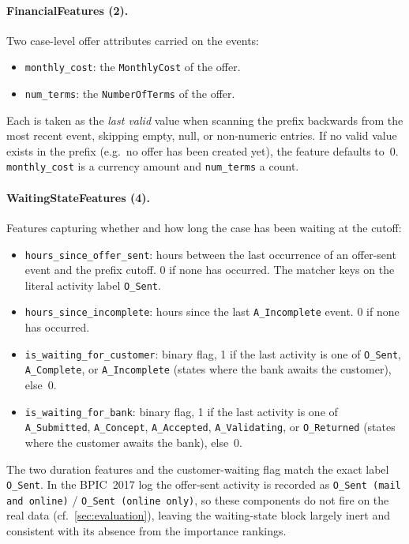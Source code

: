 \documentclass[runningheads]{llncs}
\begin{document}
\paragraph{FinancialFeatures (2).}
Two case-level offer attributes carried on the events:
\begin{itemize}
    \item \texttt{monthly\_cost}: the \texttt{MonthlyCost} of the offer.
    \item \texttt{num\_terms}: the \texttt{NumberOfTerms} of the offer.
\end{itemize}
Each is taken as the \emph{last valid} value when scanning the prefix backwards
from the most recent event, skipping empty, null, or non-numeric entries. If no
valid value exists in the prefix (e.g.\ no offer has been created yet), the
feature defaults to~0. \texttt{monthly\_cost} is a currency amount and
\texttt{num\_terms} a count.

\paragraph{WaitingStateFeatures (4).}
Features capturing whether and how long the case has been waiting at the cutoff:
\begin{itemize}
    \item \texttt{hours\_since\_offer\_sent}: hours between the last occurrence
          of an offer-sent event and the prefix cutoff. 0 if none has occurred.
          The matcher keys on the literal activity label \texttt{O\_Sent}.
    \item \texttt{hours\_since\_incomplete}: hours since the last
          \texttt{A\_Incomplete} event. 0 if none has occurred.
    \item \texttt{is\_waiting\_for\_customer}: binary flag, 1 if the last
          activity is one of \texttt{O\_Sent}, \texttt{A\_Complete}, or
          \texttt{A\_Incomplete} (states where the bank awaits the customer),
          else~0.
    \item \texttt{is\_waiting\_for\_bank}: binary flag, 1 if the last activity
          is one of \texttt{A\_Submitted}, \texttt{A\_Concept},
          \texttt{A\_Accepted}, \texttt{A\_Validating}, or \texttt{O\_Returned}
          (states where the customer awaits the bank), else~0.
\end{itemize}
The two duration features and the customer-waiting flag match the exact label
\texttt{O\_Sent}. In the BPIC~2017 log the offer-sent activity is recorded as
\texttt{O\_Sent (mail and online)} / \texttt{O\_Sent (online only)}, so these
components do not fire on the real data (cf.\ \autoref{sec:evaluation}), leaving
the waiting-state block largely inert and consistent with its absence from the
importance rankings.
\end{document}
